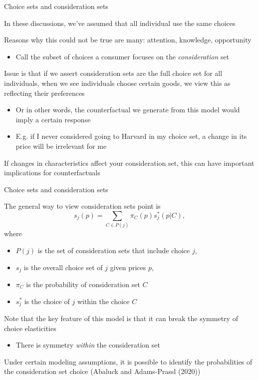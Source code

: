 \documentclass[notes,11pt, aspectratio=169]{beamer}
\newenvironment{wideitemize}{\itemize\addtolength{\itemsep}{10pt}}{\enditemize}
\begin{document}
\begin{frame}{Choice sets and consideration sets}
  \begin{wideitemize}
  \item In these discussions, we've assumed that all individual use the same choices
  \item Reasons why this could not be true are many: attention,
    knowledge, opportunity
    \begin{itemize}
    \item Call the subset of choices a consumer focuses on the
      \emph{consideration} set
    \end{itemize}
  \item Issue is that if we assert consideration sets are the full
    choice set for all individuals, when we see individuals choose
    certain goods, we view this as reflecting their preferences
    \begin{itemize}
    \item Or in other words, the counterfactual we generate from this
      model would imply a certain response
    \item E.g. if I never considered going to Harvard in my choice
      set, a change in its price will be irrelevant for me
    \end{itemize}
  \item If changes in characteristics affect your consideration set,
    this can have important implications for counterfactuals
  \end{wideitemize}
\end{frame}

\begin{frame}{Choice sets and consideration sets}
  \begin{wideitemize}
  \item The general way to view consideration sets point is
  \begin{equation*}
    s_{j}(p) = \sum_{C \in P(j)} \pi_{C}(p) s_{j}^{*}(p | C),
  \end{equation*}
  where
  \begin{itemize}
  \item $P(j)$ is the set of consideration sets that include choice $j$,
  \item  $s_{j}$ is the overall choice set of $j$ given prices $p$,
  \item  $\pi_{C}$ is the probability of consideration set $C$
  \item   $s_{j}^{*}$ is the choice of $j$ within the choice $C$ 
  \end{itemize}
\item Note that the key feature of this model is that it can break the
  symmetry of choice elasticities
  \begin{itemize}
  \item There is symmetry \emph{within} the consideration set
  \end{itemize}
\item Under certain modeling assumptions, it is possible to identify
  the probabilities of the consideration set choice (Abaluck and
  Adams-Prassl (2020))
\end{wideitemize}
\end{frame}
\end{document}
